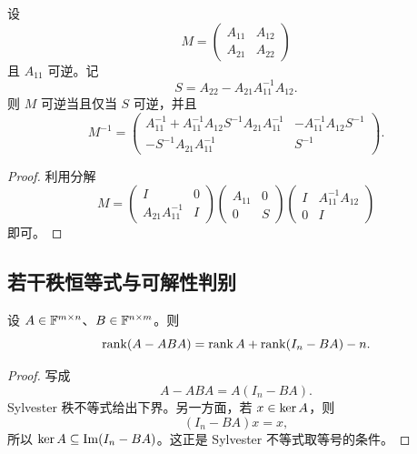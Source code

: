 \begin{theorem}
设
\begin{equation}
 M=\begin{pmatrix}A_{11}&A_{12}\\A_{21}&A_{22}\end{pmatrix}
\end{equation}
且 $A_{11}$ 可逆。记
\begin{equation}
 S=A_{22}-A_{21}A_{11}^{-1}A_{12}.
\end{equation}
则 $M$ 可逆当且仅当 $S$ 可逆，并且
\begin{equation}
 M^{-1}=\begin{pmatrix}
 A_{11}^{-1}+A_{11}^{-1}A_{12}S^{-1}A_{21}A_{11}^{-1}
 &-A_{11}^{-1}A_{12}S^{-1}\\
 -S^{-1}A_{21}A_{11}^{-1}&S^{-1}
 \end{pmatrix}.
\end{equation}
\end{theorem}

\begin{proof}
利用分解
\begin{equation}
 M=
 \begin{pmatrix}I&0\\A_{21}A_{11}^{-1}&I\end{pmatrix}
 \begin{pmatrix}A_{11}&0\\0&S\end{pmatrix}
 \begin{pmatrix}I&A_{11}^{-1}A_{12}\\0&I\end{pmatrix}
\end{equation}
即可。
\end{proof}

\subsection{若干秩恒等式与可解性判别}

\begin{theorem}
设 $A\in\mathbb F^{m\times n}$、$B\in\mathbb F^{n\times m}$。则
\begin{equation}
 \operatorname{rank}(A-ABA)=\operatorname{rank} A+\operatorname{rank}(I_n-BA)-n.
\end{equation}
\end{theorem}

\begin{proof}
写成
\begin{equation}
 A-ABA=A(I_n-BA).
\end{equation}
Sylvester 秩不等式给出下界。另一方面，若 $x\in\operatorname{ker} A$，则
\begin{equation}
 (I_n-BA)x=x,
\end{equation}
所以 $\operatorname{ker} A\subseteq\operatorname{Im}(I_n-BA)$。这正是 Sylvester 不等式取等号的条件。
\end{proof}


